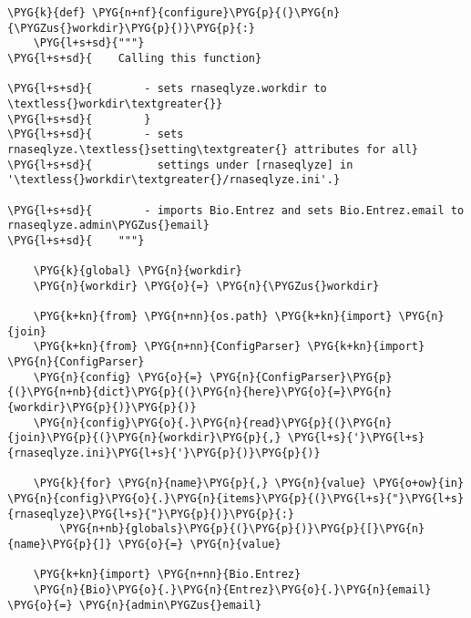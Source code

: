 \begin{Verbatim}[commandchars=\\\{\}]
\PYG{k}{def} \PYG{n+nf}{configure}\PYG{p}{(}\PYG{n}{\PYGZus{}workdir}\PYG{p}{)}\PYG{p}{:}
    \PYG{l+s+sd}{"""}
\PYG{l+s+sd}{    Calling this function}

\PYG{l+s+sd}{        - sets rnaseqlyze.workdir to \textless{}workdir\textgreater{}}
\PYG{l+s+sd}{        }
\PYG{l+s+sd}{        - sets rnaseqlyze.\textless{}setting\textgreater{} attributes for all}
\PYG{l+s+sd}{          settings under [rnaseqlyze] in '\textless{}workdir\textgreater{}/rnaseqlyze.ini'.}

\PYG{l+s+sd}{        - imports Bio.Entrez and sets Bio.Entrez.email to rnaseqlyze.admin\PYGZus{}email}
\PYG{l+s+sd}{    """}

    \PYG{k}{global} \PYG{n}{workdir}
    \PYG{n}{workdir} \PYG{o}{=} \PYG{n}{\PYGZus{}workdir}

    \PYG{k+kn}{from} \PYG{n+nn}{os.path} \PYG{k+kn}{import} \PYG{n}{join}
    \PYG{k+kn}{from} \PYG{n+nn}{ConfigParser} \PYG{k+kn}{import} \PYG{n}{ConfigParser}
    \PYG{n}{config} \PYG{o}{=} \PYG{n}{ConfigParser}\PYG{p}{(}\PYG{n+nb}{dict}\PYG{p}{(}\PYG{n}{here}\PYG{o}{=}\PYG{n}{workdir}\PYG{p}{)}\PYG{p}{)}
    \PYG{n}{config}\PYG{o}{.}\PYG{n}{read}\PYG{p}{(}\PYG{n}{join}\PYG{p}{(}\PYG{n}{workdir}\PYG{p}{,} \PYG{l+s}{'}\PYG{l+s}{rnaseqlyze.ini}\PYG{l+s}{'}\PYG{p}{)}\PYG{p}{)}

    \PYG{k}{for} \PYG{n}{name}\PYG{p}{,} \PYG{n}{value} \PYG{o+ow}{in} \PYG{n}{config}\PYG{o}{.}\PYG{n}{items}\PYG{p}{(}\PYG{l+s}{"}\PYG{l+s}{rnaseqlyze}\PYG{l+s}{"}\PYG{p}{)}\PYG{p}{:}
        \PYG{n+nb}{globals}\PYG{p}{(}\PYG{p}{)}\PYG{p}{[}\PYG{n}{name}\PYG{p}{]} \PYG{o}{=} \PYG{n}{value}

    \PYG{k+kn}{import} \PYG{n+nn}{Bio.Entrez}
    \PYG{n}{Bio}\PYG{o}{.}\PYG{n}{Entrez}\PYG{o}{.}\PYG{n}{email} \PYG{o}{=} \PYG{n}{admin\PYGZus{}email}
\end{Verbatim}


